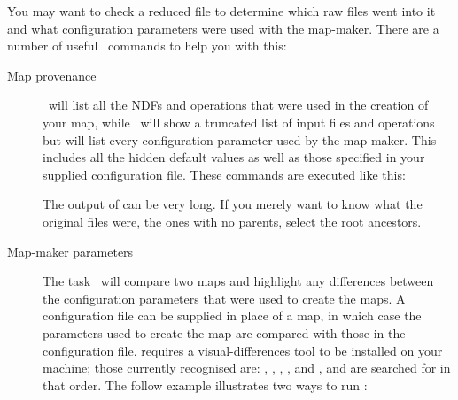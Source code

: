 You may want to check a reduced file to determine which raw files went
into it and what configuration parameters were used with the
map-maker. There are a number of useful \Kappa\ commands to help you
with this:

\begin{description}
\item[Map provenance]
  \provshow\ will list all the NDFs and operations that were used in the
  creation of your map, while \hislist\ will show a truncated list of input
  files and operations but will list every configuration parameter used by
  the map-maker.  This includes all the hidden default values as well as
  those specified in your supplied configuration file. These commands are
  executed like this:

\begin{terminalv}
\end{terminalv}

The output of  can be very long.  If you merely want to
know what the original files were, the ones with no parents, select the
root ancestors.

\begin{terminalv}
\end{terminalv}


\item[Map-maker parameters]
The task \configmeld\ will compare two maps and highlight any differences
between the configuration parameters that were used to create the maps. A
configuration file can be supplied in place of a map, in which case the
parameters used to create the map are compared with those in the
configuration file.  requires a visual-differences tool
to be installed on your machine; those currently recognised are:
,
,
,
, and
,
and are searched for in that order. The follow example illustrates two
ways to run :

\begin{terminalv}
\end{terminalv}


\end{description}
